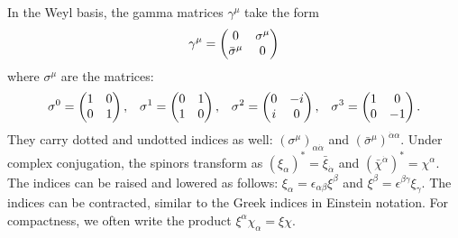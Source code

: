 In the Weyl basis, the gamma matrices $\gamma^\mu$ take the form
\begin{equation}
  \gamma^\mu = \begin{pmatrix} 0 & \sigma^\mu \\ \bar{\sigma}^\mu & 0\end{pmatrix}
\end{equation}
where $\sigma^\mu$ are the matrices:
\begin{align*}
\sigma^0 = \begin{pmatrix} 1 & 0 \\ 0 & 1\end{pmatrix}, && \sigma^1 = \begin{pmatrix} 0 & 1 \\ 1 & 0\end{pmatrix}, && \sigma^2 = \begin{pmatrix} 0 & -i \\ i & 0\end{pmatrix}, && \sigma^3 = \begin{pmatrix} 1 & 0 \\ 0 & -1\end{pmatrix}.
\end{align*}
They carry dotted and undotted indices as well: $(\sigma^\mu)_{\alpha\dot{\alpha}}$ and $(\bar{\sigma}^\mu)^{\dot{\alpha}\alpha}$. Under complex conjugation, the spinors transform as
$(\xi_\alpha)^* = \bar{\xi}_{\dot{\alpha}}$ and $(\bar{\chi}^{\dot{\alpha}})^* = \chi^{\alpha}$. The indices can be raised and lowered as follows: $\xi_\alpha = \epsilon_{\alpha\beta}\xi^\beta$ and $\xi^\beta = \epsilon^{\beta\gamma}\xi_\gamma$.
The indices can be contracted, similar to the Greek indices in Einstein notation. For compactness, we often write the product $\xi^\alpha\chi_\alpha = \xi\chi$.
